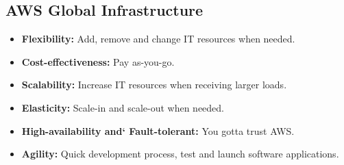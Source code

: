 \subsection{AWS Global Infrastructure}\label{subsec:aws-global-infrastructure}
\begin{itemize}
	\item \textbf{Flexibility:} Add, remove and change IT resources when needed.
	\item \textbf{Cost-effectiveness:} Pay as-you-go.
	\item \textbf{Scalability:} Increase IT resources when receiving larger loads.
	\item \textbf{Elasticity:} Scale-in and scale-out when needed.
	\item \textbf{High-availability and` Fault-tolerant:} You gotta trust AWS.
	\item \textbf{Agility:} Quick development process, test and launch software applications.
\end{itemize}


